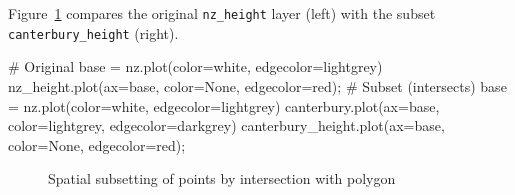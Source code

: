 \documentclass[
  letterpaper,
]{krantz}
\newenvironment{Shaded}{\begin{snugshade}}{\end{snugshade}}
\newcommand{\CommentTok}[1]{\textcolor[rgb]{0.37,0.37,0.37}{#1}}
\newcommand{\NormalTok}[1]{\textcolor[rgb]{0.00,0.23,0.31}{#1}}
\newcommand{\OperatorTok}[1]{\textcolor[rgb]{0.37,0.37,0.37}{#1}}
\newcommand{\StringTok}[1]{\textcolor[rgb]{0.13,0.47,0.30}{#1}}
\begin{document}
Figure~\ref{fig-spatial-subset} compares the original
\texttt{nz\_height} layer (left) with the subset
\texttt{canterbury\_height} (right).

\begin{Shaded}
\begin{Highlighting}[]
\CommentTok{\# Original}
\NormalTok{base }\OperatorTok{=}\NormalTok{ nz.plot(color}\OperatorTok{=}\StringTok{\textquotesingle{}white\textquotesingle{}}\NormalTok{, edgecolor}\OperatorTok{=}\StringTok{\textquotesingle{}lightgrey\textquotesingle{}}\NormalTok{)}
\NormalTok{nz\_height.plot(ax}\OperatorTok{=}\NormalTok{base, color}\OperatorTok{=}\StringTok{\textquotesingle{}None\textquotesingle{}}\NormalTok{, edgecolor}\OperatorTok{=}\StringTok{\textquotesingle{}red\textquotesingle{}}\NormalTok{)}\OperatorTok{;}
\CommentTok{\# Subset (intersects)}
\NormalTok{base }\OperatorTok{=}\NormalTok{ nz.plot(color}\OperatorTok{=}\StringTok{\textquotesingle{}white\textquotesingle{}}\NormalTok{, edgecolor}\OperatorTok{=}\StringTok{\textquotesingle{}lightgrey\textquotesingle{}}\NormalTok{)}
\NormalTok{canterbury.plot(ax}\OperatorTok{=}\NormalTok{base, color}\OperatorTok{=}\StringTok{\textquotesingle{}lightgrey\textquotesingle{}}\NormalTok{, edgecolor}\OperatorTok{=}\StringTok{\textquotesingle{}darkgrey\textquotesingle{}}\NormalTok{)}
\NormalTok{canterbury\_height.plot(ax}\OperatorTok{=}\NormalTok{base, color}\OperatorTok{=}\StringTok{\textquotesingle{}None\textquotesingle{}}\NormalTok{, edgecolor}\OperatorTok{=}\StringTok{\textquotesingle{}red\textquotesingle{}}\NormalTok{)}\OperatorTok{;}
\end{Highlighting}
\end{Shaded}

\begin{figure}

\begin{minipage}{0.50\linewidth}



\end{minipage}%
%
\begin{minipage}{0.50\linewidth}



\end{minipage}%

\caption{\label{fig-spatial-subset}Spatial subsetting of points by
intersection with polygon}

\end{figure}%
\end{document}
